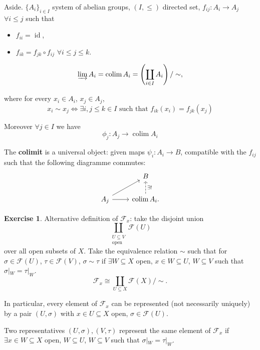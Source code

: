 \documentclass[12pt]{article}
\DeclareMathOperator{\id}{id}
\DeclareMathOperator*{\colim}{colim}
\theoremstyle{definition}
\newtheorem*{exercise}{Exercise}
\begin{document}
Aside. $\{A_i\}_{i\in I}$ system of abelian groups, $(I,\leq)$ directed set, $f_{ij}:A_i\rightarrow A_j$ $\forall i\leq j$ such that
\begin{itemize}
\item $f_{ii}=\id$,
\item $f_{ik}=f_{jk}\circ f_{ij}$ $\forall i\leq j\leq k$.
\end{itemize}

\[\varinjlim A_i=\colim A_i=\left(\coprod_{i\in I}A_i\right)/\sim,\]

where for every $x_i\in A_i$, $x_j\in A_j$,
\[x_i\sim x_j\Leftrightarrow\exists i,j\leq k\in I\text{ such that }f_{ik}(x_i)=f_{jk}(x_j)\]

Moreover $\forall j\in I$ we have
\[\phi_j:A_j\longrightarrow\colim A_i\]

The \textbf{colimit} is a universal object: given maps $\psi_i:A_i\rightarrow B$, compatible with the $f_{ij}$ such that the following diagramme commutes:
\[
\begin{tikzcd}
&B\\
A_j\arrow[ru]\arrow[r]&\colim A_i.\arrow[u,dashed,"\exists!",swap]
\end{tikzcd}
\]

\begin{exercise}
Alternative definition of $\mathcal{F}_x$: take the disjoint union
\[\coprod_{\substack{U\subseteq V\\\text{open}}}\mathcal{F}(U)\]
over all open subsets of $X$. Take the equivalence relation $\sim$ such that for $\sigma\in\mathcal{F}(U)$, $\tau\in\mathcal{F}(V)$, $\sigma\sim\tau$ if $\exists W\subseteq X$ open, $x\in W\subseteq U$, $W\subseteq V$ such that $\sigma|_W=\tau|_W$.
\[\mathcal{F}_x\cong\coprod_{U\subseteq X}\mathcal{F}(X)/\sim.\]

In particular, every element of $\mathcal{F}_x$ can be represented (not necessarily uniquely) by a pair $(U,\sigma)$ with $x\in U\subseteq X$ open, $\sigma\in\mathcal{F}(U)$.

Two representatives $(U,\sigma),(V,\tau)$ represent the same element of $\mathcal{F}_x$ if $\exists x\in W\subseteq X$ open, $W\subseteq U$, $W\subseteq V$ such that $\sigma|_W=\tau|_W$.
\end{exercise}
\end{document}

